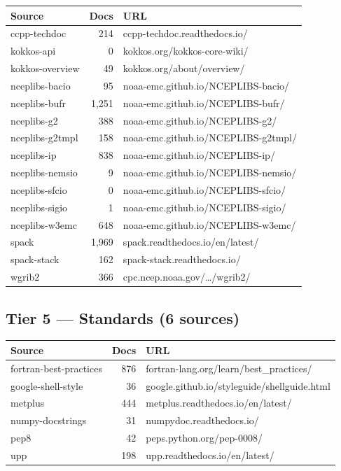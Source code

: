 \documentclass[11pt,letterpaper]{article}
\begin{document}
\begin{longtable}{p{3.2cm}rp{7.5cm}}
\toprule
\textbf{Source} & \textbf{Docs} & \textbf{URL} \\
\midrule
\endhead
ccpp-techdoc & 214 & ccpp-techdoc.readthedocs.io/ \\
kokkos-api & 0 & kokkos.org/kokkos-core-wiki/ \\
kokkos-overview & 49 & kokkos.org/about/overview/ \\
nceplibs-bacio & 95 & noaa-emc.github.io/NCEPLIBS-bacio/ \\
nceplibs-bufr & 1,251 & noaa-emc.github.io/NCEPLIBS-bufr/ \\
nceplibs-g2 & 388 & noaa-emc.github.io/NCEPLIBS-g2/ \\
nceplibs-g2tmpl & 158 & noaa-emc.github.io/NCEPLIBS-g2tmpl/ \\
nceplibs-ip & 838 & noaa-emc.github.io/NCEPLIBS-ip/ \\
nceplibs-nemsio & 9 & noaa-emc.github.io/NCEPLIBS-nemsio/ \\
nceplibs-sfcio & 0 & noaa-emc.github.io/NCEPLIBS-sfcio/ \\
nceplibs-sigio & 1 & noaa-emc.github.io/NCEPLIBS-sigio/ \\
nceplibs-w3emc & 648 & noaa-emc.github.io/NCEPLIBS-w3emc/ \\
spack & 1,969 & spack.readthedocs.io/en/latest/ \\
spack-stack & 162 & spack-stack.readthedocs.io/ \\
wgrib2 & 366 & cpc.ncep.noaa.gov/\ldots/wgrib2/ \\
\bottomrule
\end{longtable}

\subsection{Tier 5 — Standards (6 sources)}

\begin{longtable}{p{3.8cm}rp{7cm}}
\toprule
\textbf{Source} & \textbf{Docs} & \textbf{URL} \\
\midrule
\endhead
fortran-best-practices & 876 & fortran-lang.org/learn/best\_practices/ \\
google-shell-style & 36 & google.github.io/styleguide/shellguide.html \\
metplus & 444 & metplus.readthedocs.io/en/latest/ \\
numpy-docstrings & 31 & numpydoc.readthedocs.io/ \\
pep8 & 42 & peps.python.org/pep-0008/ \\
upp & 198 & upp.readthedocs.io/en/latest/ \\
\bottomrule
\end{longtable}
\end{document}

